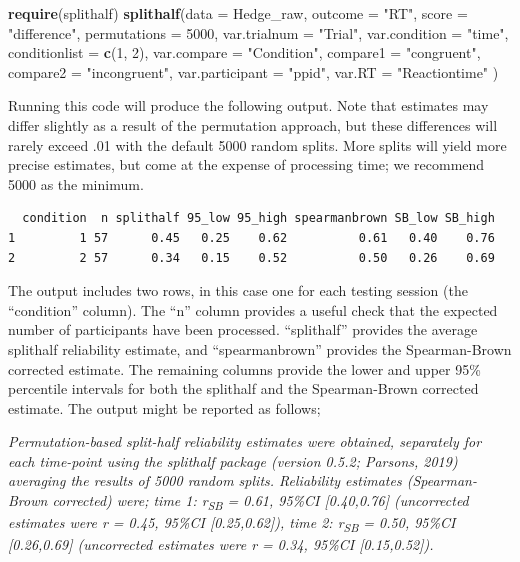 \documentclass[english,,man,floatsintext]{apa6}
\newenvironment{Shaded}{\begin{snugshade}}{\end{snugshade}}
\newcommand{\DataTypeTok}[1]{\textcolor[rgb]{0.13,0.29,0.53}{#1}}
\newcommand{\DecValTok}[1]{\textcolor[rgb]{0.00,0.00,0.81}{#1}}
\newcommand{\KeywordTok}[1]{\textcolor[rgb]{0.13,0.29,0.53}{\textbf{#1}}}
\newcommand{\NormalTok}[1]{#1}
\newcommand{\StringTok}[1]{\textcolor[rgb]{0.31,0.60,0.02}{#1}}
\begin{document}
\begin{Shaded}
\begin{Highlighting}[]
\KeywordTok{require}\NormalTok{(splithalf)}
\KeywordTok{splithalf}\NormalTok{(}\DataTypeTok{data =}\NormalTok{ Hedge_raw,}
          \DataTypeTok{outcome =} \StringTok{"RT"}\NormalTok{,}
          \DataTypeTok{score =} \StringTok{"difference"}\NormalTok{,}
          \DataTypeTok{permutations =} \DecValTok{5000}\NormalTok{,}
          \DataTypeTok{var.trialnum =} \StringTok{"Trial"}\NormalTok{,}
          \DataTypeTok{var.condition =} \StringTok{"time"}\NormalTok{,}
          \DataTypeTok{conditionlist =} \KeywordTok{c}\NormalTok{(}\DecValTok{1}\NormalTok{, }\DecValTok{2}\NormalTok{),}
          \DataTypeTok{var.compare =} \StringTok{"Condition"}\NormalTok{,}
          \DataTypeTok{compare1 =} \StringTok{"congruent"}\NormalTok{,}
          \DataTypeTok{compare2 =} \StringTok{"incongruent"}\NormalTok{,}
          \DataTypeTok{var.participant =} \StringTok{"ppid"}\NormalTok{,}
          \DataTypeTok{var.RT =} \StringTok{"Reactiontime"}\NormalTok{ )}
\end{Highlighting}
\end{Shaded}

Running this code will produce the following output. Note that estimates may differ slightly as a result of the permutation approach, but these differences will rarely exceed .01 with the default 5000 random splits. More splits will yield more precise estimates, but come at the expense of processing time; we recommend 5000 as the minimum.

\begin{verbatim}
  condition  n splithalf 95_low 95_high spearmanbrown SB_low SB_high
1         1 57      0.45   0.25    0.62          0.61   0.40    0.76
2         2 57      0.34   0.15    0.52          0.50   0.26    0.69
\end{verbatim}

The output includes two rows, in this case one for each testing session (the \enquote{condition} column). The \enquote{n} column provides a useful check that the expected number of participants have been processed. \enquote{splithalf} provides the average splithalf reliability estimate, and \enquote{spearmanbrown} provides the Spearman-Brown corrected estimate. The remaining columns provide the lower and upper 95\% percentile intervals for both the splithalf and the Spearman-Brown corrected estimate. The output might be reported as follows;

\emph{Permutation-based split-half reliability estimates were obtained, separately for each time-point using the splithalf package (version 0.5.2; Parsons, 2019) averaging the results of 5000 random splits. Reliability estimates (Spearman-Brown corrected) were; time 1: r\textsubscript{SB} = 0.61, 95\%CI {[}0.40,0.76{]} (uncorrected estimates were r = 0.45, 95\%CI {[}0.25,0.62{]}), time 2: r\textsubscript{SB} = 0.50, 95\%CI {[}0.26,0.69{]} (uncorrected estimates were r = 0.34, 95\%CI {[}0.15,0.52{]}).}
\end{document}

